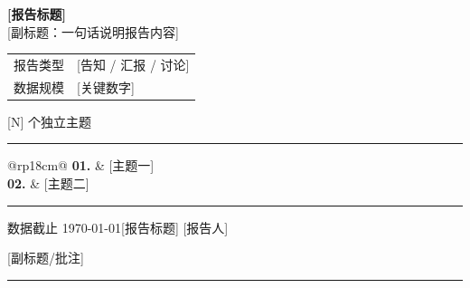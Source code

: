 \documentclass[11pt,a4paper,landscape]{ctexart}
\newcommand{\slidetitle}[2]{%
    \noindent{\Large\bfseries #1}\hfill{\normalsize\color{gray!70!black} #2}\par
    \vspace{0.2em}
    \noindent\textcolor{gray!50}{\rule{\linewidth}{0.6pt}}\par
    \vspace{0.6em}
}
\newcommand{\footerline}{%
    \vfill
    \noindent\textcolor{gray!50}{\rule{\linewidth}{0.3pt}}\par
    \vspace{0.1em}
    {\footnotesize\color{gray!70} %
     数据截止 \today \hfill [报告标题] \hfill [报告人]}
}
\begin{document}
\begin{center}
\vspace*{2.5cm}
{\Huge\bfseries [报告标题]}\\[0.9em]
{\Large [副标题：一句话说明报告内容]}\\[3em]

\begin{tabular}{@{}rl@{}}
{\Large 报告类型}\quad & {\Large [告知 / 汇报 / 讨论]} \\[0.6em]
{\Large 数据规模}\quad & {\Large [关键数字]} \\
\end{tabular}
\end{center}

\newpage

\slidetitle{目录}{[N] 个独立主题}

\vspace{2em}
\begin{center}
\begin{tabular}{@{}rp{18cm}@{}}
\Large\textbf{01.} & \Large [主题一] \\[1em]
\Large\textbf{02.} & \Large [主题二] \\[1em]
\end{tabular}
\end{center}

\footerline
\newpage

\slidetitle{01 \quad [页标题]}{[副标题/批注]}


\end{document}
